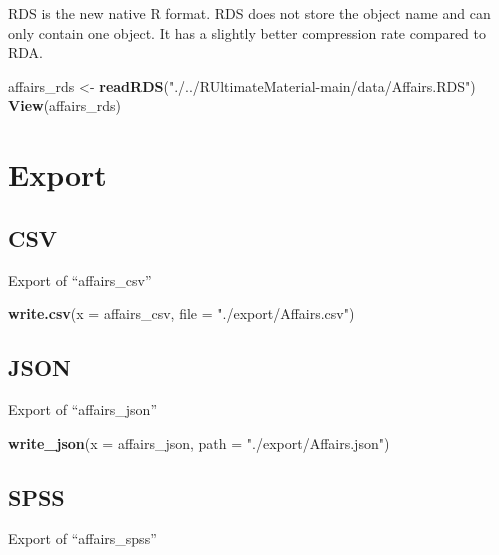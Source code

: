 \documentclass[
]{article}
\newenvironment{Shaded}{\begin{snugshade}}{\end{snugshade}}
\newcommand{\AttributeTok}[1]{\textcolor[rgb]{0.13,0.29,0.53}{#1}}
\newcommand{\FunctionTok}[1]{\textcolor[rgb]{0.13,0.29,0.53}{\textbf{#1}}}
\newcommand{\NormalTok}[1]{#1}
\newcommand{\OtherTok}[1]{\textcolor[rgb]{0.56,0.35,0.01}{#1}}
\newcommand{\StringTok}[1]{\textcolor[rgb]{0.31,0.60,0.02}{#1}}
\begin{document}
RDS is the new native R format. RDS does not store the object name and
can only contain one object. It has a slightly better compression rate
compared to RDA.

\begin{Shaded}
\begin{Highlighting}[]
\NormalTok{affairs\_rds }\OtherTok{\textless{}{-}} \FunctionTok{readRDS}\NormalTok{(}\StringTok{"./../RUltimateMaterial{-}main/data/Affairs.RDS"}\NormalTok{)}
\FunctionTok{View}\NormalTok{(affairs\_rds)}
\end{Highlighting}
\end{Shaded}

\section{Export}\label{export}

\subsection{CSV}\label{csv-1}

Export of ``affairs\_csv''

\begin{Shaded}
\begin{Highlighting}[]
\FunctionTok{write.csv}\NormalTok{(}\AttributeTok{x =}\NormalTok{ affairs\_csv, }\AttributeTok{file =} \StringTok{"./export/Affairs.csv"}\NormalTok{)}
\end{Highlighting}
\end{Shaded}

\subsection{JSON}\label{json-1}

Export of ``affairs\_json''

\begin{Shaded}
\begin{Highlighting}[]
\FunctionTok{write\_json}\NormalTok{(}\AttributeTok{x =}\NormalTok{ affairs\_json, }\AttributeTok{path =} \StringTok{"./export/Affairs.json"}\NormalTok{)}
\end{Highlighting}
\end{Shaded}

\subsection{SPSS}\label{spss-1}

Export of ``affairs\_spss''
\end{document}
